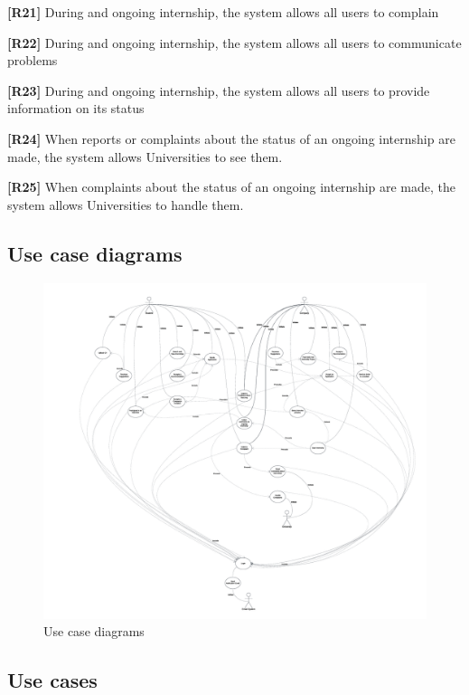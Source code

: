 \textbf{[R21]} During and ongoing internship, the system allows all users to complain 

\textbf{[R22]} During and ongoing internship, the system allows all users to communicate problems 

\textbf{[R23]} During and ongoing internship, the system allows all users to provide information on its status

\textbf{[R24]} When reports or complaints about the status of an ongoing internship are made, the system allows Universities to see them.

\textbf{[R25]} When complaints about the status of an ongoing internship are made, the system allows Universities to handle them.

\pagebreak

\subsection{Use case diagrams}

\begin{figure}[H]
    \centering
    \includegraphics[width=1\linewidth]{RASD//Images/usecase.png}
    \caption{Use case diagrams}
    \label{fig:enter-label}
\end{figure}

\pagebreak
\subsection{Use cases}

